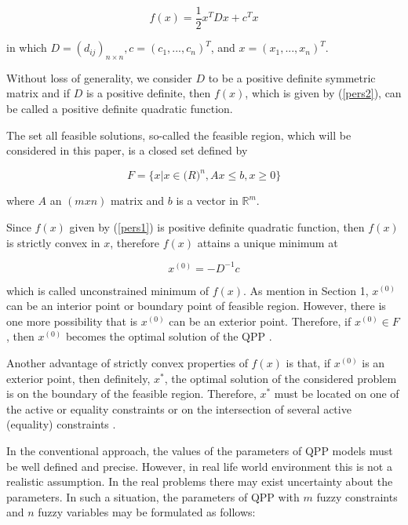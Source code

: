 \documentclass{iaesarticle3}
\begin{document}
\begin{equation}\label{pers2}
    f(x) = \frac{1}{2} x^TDx + c^Tx
\end{equation}

\noindent in which $D = (d_{ij})_{n \times n}, c = (c_1,..., c_n)^T$, and $x = (x_1,..., x_n)^T$.

Without loss of generality, we consider $D$ to be a positive definite symmetric matrix and if $D$ is a positive definite, then $f(x)$, which is given by (\ref{pers2}), can be called a positive definite quadratic function.

The set all feasible solutions, so-called the feasible region, which will be considered in this paper, is a closed set defined by

\begin{equation}\label{pers3}
    F = \{x|x \in \mathbb(R)^n, Ax \leq b, x \geq 0 \}
\end{equation}

\noindent where $A$ an $(mxn)$ matrix and $b$ is a vector in $\mathbb{R}^m$.

Since $f(x)$ given by (\ref{pers1}) is positive definite quadratic function, then $f(x)$ is strictly convex in $x$, therefore $f(x)$ attains a unique minimum at

\begin{equation}\label{pers4}
    x^{(0)} = -D^{-1}c
\end{equation}

\noindent which is called unconstrained minimum of $f(x)$. As mention in Section 1, $x^{(0)}$ can be an interior point or boundary point of feasible region. However, there is one more possibility that is $x^{(0)}$ can be an exterior point. Therefore, if $x^{(0)} \in F$, then $x^{(0)}$ becomes the optimal solution of the QPP \cite{iby}.

Another advantage of strictly convex properties of $f(x)$ is that, if $x^{(0)}$ is an exterior point, then definitely, $x^*$, the optimal solution of the considered problem is on the boundary of the feasible region. Therefore, $x^*$ must be located on one of the active or equality constraints or on the intersection of several active (equality) constraints \cite{isy, ism}.

In the conventional approach, the values of the parameters of QPP models must be well defined and precise. However, in real life world environment this is not a realistic assumption. In the real problems there may exist uncertainty about the parameters. In such a situation, the parameters of QPP with $m$ fuzzy constraints and $n$ fuzzy variables may be formulated as follows:
\end{document}
